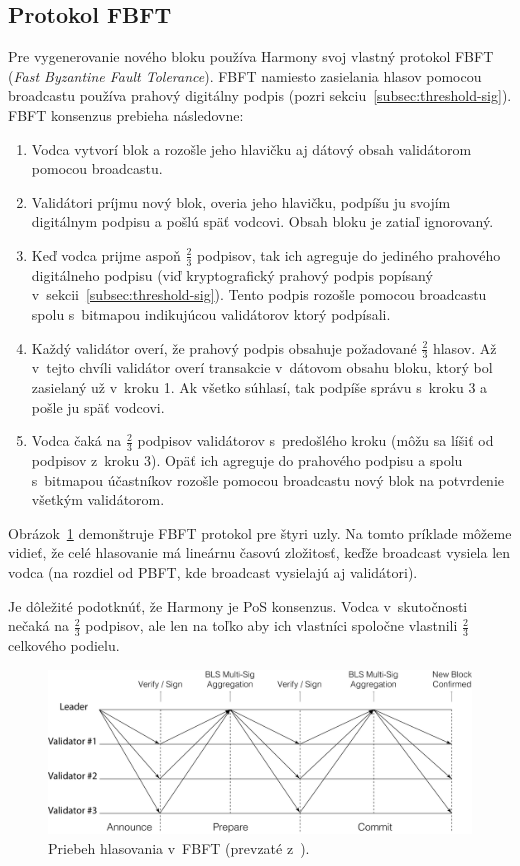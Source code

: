 \subsection{Protokol FBFT}\label{subsec:fbft}
Pre vygenerovanie nového bloku používa Harmony svoj vlastný protokol FBFT (\textit{Fast Byzantine Fault Tolerance}). FBFT namiesto zasielania hlasov pomocou broadcastu používa prahový digitálny podpis (pozri sekciu~\ref{subsec:threshold-sig}). FBFT konsenzus prebieha následovne:
\begin{enumerate}
	\item Vodca vytvorí blok a rozošle jeho hlavičku aj dátový obsah validátorom pomocou broadcastu.
	\item Validátori príjmu nový blok, overia jeho hlavičku, podpíšu ju svojím digitálnym podpisu a pošlú späť vodcovi. Obsah bloku je zatiaľ ignorovaný.
	\item Keď vodca prijme aspoň $\frac{2}{3}$ podpisov, tak ich agreguje do jediného prahového digitálneho podpisu (viď kryptografický prahový podpis popísaný v~sekcii~\ref{subsec:threshold-sig}). Tento podpis rozošle pomocou broadcastu spolu s~bitmapou indikujúcou validátorov ktorý podpísali.
	\item Každý validátor overí, že prahový podpis obsahuje požadované $\frac{2}{3}$ hlasov. Až v~tejto chvíli validátor overí transakcie v~dátovom obsahu bloku, ktorý bol zasielaný už v~kroku 1. Ak všetko súhlasí, tak podpíše správu s~kroku 3 a pošle ju späť vodcovi.
	\item Vodca čaká na $\frac{2}{3}$ podpisov validátorov s~predošlého kroku (môžu sa líšiť od podpisov z~kroku 3). Opäť ich agreguje do prahového podpisu a spolu s~bitmapou účastníkov rozošle pomocou broadcastu nový blok na potvrdenie všetkým validátorom. 
\end{enumerate}
Obrázok~\ref{img:fbft} demonštruje FBFT protokol pre štyri uzly. Na tomto príklade môžeme vidieť, že celé hlasovanie má lineárnu časovú zložitosť, keďže broadcast vysiela len vodca (na rozdiel od PBFT, kde broadcast vysielajú aj validátori).

Je dôležité podotknúť, že Harmony je PoS konsenzus. Vodca v~skutočnosti nečaká na $\frac{2}{3}$ podpisov, ale len na toľko aby ich vlastníci spoločne vlastnili $\frac{2}{3}$ celkového podielu.

\begin{figure}[bt]
	\centering
	\includegraphics[width=.7\textwidth]{obrazky-figures/harmony-fbft}
	\caption{Priebeh hlasovania v~FBFT (prevzaté z~\cite{harmonyWp}).}
	\label{img:fbft}
\end{figure}

